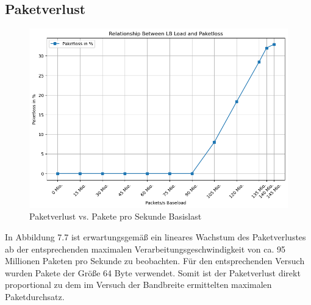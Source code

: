 \subsection{Paketverlust}
\begin{figure}
    \centering
    \includegraphics[width=0.95\linewidth]{images/packetloss.png}
    \caption{Paketverlust vs. Pakete pro Sekunde Basislast}
    \label{fig:enter-label}
\end{figure}
In Abbildung 7.7 ist erwartungsgemäß ein lineares Wachstum des Paketverlustes ab der entsprechenden maximalen Verarbeitungsgeschwindigkeit von ca. 95 Millionen Paketen pro Sekunde zu beobachten. Für den entsprechenden Versuch wurden Pakete der Größe 64 Byte verwendet. Somit ist der Paketverlust direkt proportional zu dem im  Versuch der Bandbreite ermittelten maximalen Paketdurchsatz.